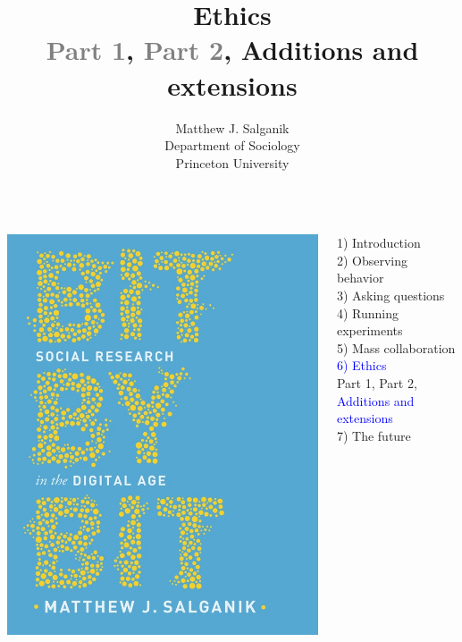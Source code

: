 \documentclass{beamer}
\title[]{Ethics\\ \textcolor{gray}{Part 1}, \textcolor{gray}{Part 2}, Additions and extensions}
\author[]{Matthew J. Salganik\\Department of Sociology\\Princeton University}
\date[]{Summer Institutes in Computational Social Science\\Day 1\\2020
\vfill
\begin{flushleft}
{\scriptsize
The Summer Institutes in Computational Social Science is supported by grants from the Russell Sage Foundation, Alfred P. Sloan Foundation, Facebook, and the Social Science Research Council.}
\end{flushleft}
\begin{flushright}
\texttt{[image: figures/cc-by.png]}
\end{flushright}
}
\begin{document}
\frame{\titlepage}
\begin{frame}

\begin{columns}
\begin{column}{.40\textwidth}
\includegraphics[width=\textwidth]{figures/salganik_bit_2018_cover}
\end{column}%

\hfill%

\begin{column}{.60\textwidth}
1) Introduction \\
2) Observing behavior \\
3) Asking questions \\
4) Running experiments \\
5) Mass collaboration \\
\textcolor{blue}{6) Ethics} \\
Part 1, Part 2, \textcolor{blue}{Additions and extensions} \\
7) The future \\
\end{column}%
\end{columns}

\end{frame}
\end{document}
